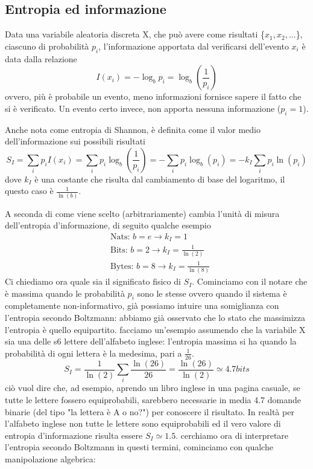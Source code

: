 \documentclass[
10pt, %
a4paper, %
oneside, %
headinclude,footinclude, %
BCOR5mm, %
]{scrartcl}
\begin{document}
\subsection{Entropia ed informazione}
\begin{definition}
	Data una variabile aleatoria discreta X, che può avere come risultati \{\(x_1,x_2,...\)\}, ciascuno di probabilità \(p_i\), l'informazione apportata dal verificarsi dell'evento \(x_i\) è data dalla relazione
	\[I(x_i) = -\log_b p_i = \log_b \left(\frac{1}{p_i}\right)\]
	ovvero, più è probabile un evento, meno informazioni fornisce sapere il fatto che si è verificato. Un evento certo invece, non apporta nessuna informazione (\(p_i = 1\)). 
\end{definition}
\begin{definition}
	Anche nota come entropia di Shannon, è definita come il valor medio dell'informazione sui possibili risultati
	\[S_I=\sum_ip_iI(x_i) = \sum_ip_i\log_b\left(\frac{1}{p_i}\right)=-\sum_ip_i\log_b(p_i)= -k_I\sum_ip_i\ln(p_i)\]
	dove \(k_I\) è una costante che risulta dal cambiamento di base del logaritmo, il questo caso è \(\frac{1}{\ln(b)}\). 
\end{definition}
A seconda di come viene scelto (arbitrariamente) cambia l'unità di misura dell'entropia d'informazione, di seguito qualche esempio 
\begin{align*}
	&\text{Nats: }b=e\rightarrow k_I = 1\\
	&\text{Bits: }b = 2\rightarrow k_I=\frac{1}{\ln(2)}\\
	&\text{Bytes: }b = 8\rightarrow k_I = \frac{1}{\ln(8)}
\end{align*}
Ci chiediamo ora quale sia il significato fisico di \(S_I\). Cominciamo con il notare che è massima quando le probabilità \(p_i\) sono le stesse ovvero quando il sistema è completamente non-informativo, già possiamo intuire una somiglianza con l'entropia secondo Boltzmann: abbiamo già osservato che lo stato che massimizza l'entropia è quello equipartito. facciamo un'esempio assumendo che la variabile X sia una delle s6 lettere dell'alfabeto inglese: l'entropia massima si ha quando la probabilità di ogni lettera è la medesima, pari a $\frac{1}{26}$. 
\[S_I = \frac{1}{\ln(2)}\sum_i\frac{\ln(26)}{26}=\frac{\ln(26)}{\ln(2)}\simeq 4.7 bits\]
ciò vuol dire che, ad esempio, aprendo un libro inglese in una pagina casuale, se tutte le lettere fossero equiprobabili, sarebbero necessarie in media 4.7 domande binarie (del tipo "la lettera è A o no?") per conoscere il risultato. In realtà per l'alfabeto inglese non tutte le lettere sono equiprobabili ed il vero valore di entropia d'informazione risulta essere \(S_I \simeq 1.5\). cerchiamo ora di interpretare l'entropia secondo Boltzmann in questi termini, cominciamo con qualche manipolazione algebrica:
\end{document}
